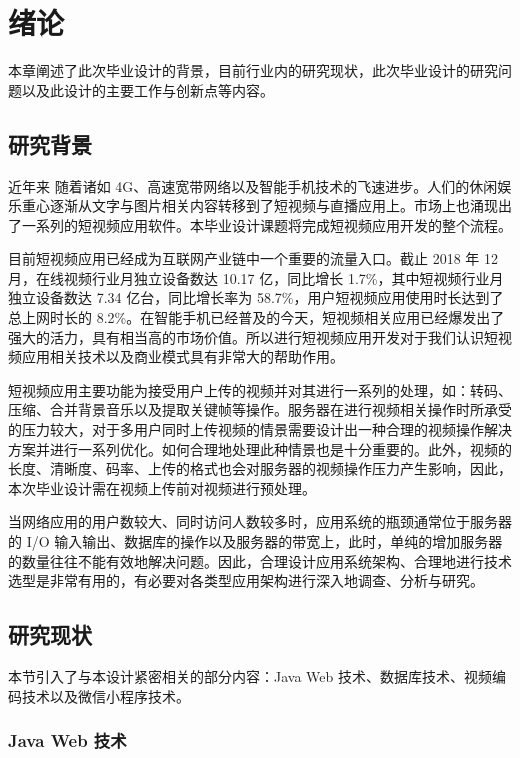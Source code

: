 \chapter{绪论}\label{sec:introduction}

本章阐述了此次毕业设计的背景，目前行业内的研究现状，此次毕业设计的研究问题以及此设计的主要工作与创新点等内容。

\section{研究背景}

近年来 随着诸如 4G、高速宽带网络以及智能手机技术的飞速进步。人们的休闲娱乐重心逐渐从文字与图片相关内容转移到了短视频与直播应用上。市场上也涌现出了一系列的短视频应用软件。本毕业设计课题将完成短视频应用开发的整个流程。

目前短视频应用已经成为互联网产业链中一个重要的流量入口。截止 2018 年 12 月，在线视频行业月独立设备数达 10.17 亿，同比增长 1.7\%，其中短视频行业月独立设备数达 7.34 亿台，同比增长率为 58.7\%，用户短视频应用使用时长达到了总上网时长的 8.2\%\cite{中国互联网络信息中心2018第}。在智能手机已经普及的今天，短视频相关应用已经爆发出了强大的活力，具有相当高的市场价值。所以进行短视频应用开发对于我们认识短视频应用相关技术以及商业模式具有非常大的帮助作用。

短视频应用主要功能为接受用户上传的视频并对其进行一系列的处理，如：转码、压缩、合并背景音乐以及提取关键帧等操作。服务器在进行视频相关操作时所承受的压力较大，对于多用户同时上传视频的情景需要设计出一种合理的视频操作解决方案并进行一系列优化。如何合理地处理此种情景也是十分重要的。此外，视频的长度、清晰度、码率、上传的格式也会对服务器的视频操作压力产生影响，因此，本次毕业设计需在视频上传前对视频进行预处理。

当网络应用的用户数较大、同时访问人数较多时，应用系统的瓶颈通常位于服务器的 I/O 输入输出、数据库的操作以及服务器的带宽上，此时，单纯的增加服务器的数量往往不能有效地解决问题\cite{rosenfeld2002information}。因此，合理设计应用系统架构、合理地进行技术选型是非常有用的，有必要对各类型应用架构进行深入地调查、分析与研究。

\section{研究现状}
本节引入了与本设计紧密相关的部分内容：Java Web 技术、数据库技术、视频编码技术以及微信小程序技术。

\subsection{Java Web 技术}

